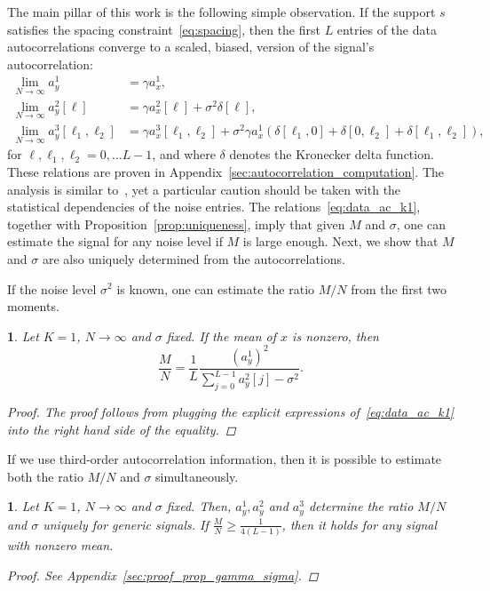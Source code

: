 \documentclass[english,11pt]{article}
\numberwithin{equation}{section}
\theoremstyle{plain}
\theoremstyle{definition}
\theoremstyle{remark}
\theoremstyle{plain}
\theoremstyle{remark}
\theoremstyle{plain}
\theoremstyle{plain}
\newtheorem{proposition}[thm]{\protect\propositionname}
\providecommand{\propositionname}{Proposition}
\begin{document}
The main pillar of this work is the following simple observation.
If the support $s$ satisfies the spacing constraint~\eqref{eq:spacing}, then the first $L$ entries of the data autocorrelations converge 
to a scaled, biased, version of the signal's autocorrelation:
\begin{align}
\lim_{N\to\infty} a_y^1 &= \gamma a_{x}^1, \nonumber\\
\lim_{N\to\infty} a_y^2[\ell] &= \gamma a_{x}^2[\ell] +\sigma^2\delta[\ell], \label{eq:data_ac_k1} \\
\lim_{N\to\infty} a_y^3[\ell_1,\ell_2] &= \gamma a_{x}^3[\ell_1,\ell_2] + \sigma^2\gamma a_{x}^1(\delta[\ell_1,0]+\delta[0,\ell_2]+\delta[\ell_1,\ell_2]), \nonumber
\end{align}
for $\ell,\ell_1,\ell_2=0,\ldots L-1$, and where $\delta$ denotes the Kronecker delta function. 
These relations are proven in Appendix~\ref{sec:autocorrelation_computation}. The analysis is similar to~\cite{bendory2017bispectrum,boumal2017heterogeneous}, yet a particular caution should be taken with the statistical dependencies of the noise entries. 
The relations~\eqref{eq:data_ac_k1}, together with Proposition~\ref{prop:uniqueness}, imply that given $M$ and $\sigma$, one can estimate the signal for any noise level if $M$ is large enough. Next, we show that  $M$ and $\sigma$ are also uniquely determined from the autocorrelations. 

If the noise level $\sigma^2$ is known, one can estimate the ratio $M/N$ from the first two moments.
\begin{proposition} \label{prop:gamma}
	Let $K=1$, $N\to\infty$ and $\sigma$ fixed. If the mean of $x$ is nonzero, then 
	\begin{equation*}
	\frac{M}{N} = \frac{1}{L}\frac{(a^1_y)^2}{\sum_{j=0}^{L-1}a_y^2[j]-\sigma^2}.
	\end{equation*}
	\begin{proof}
The proof follows from plugging the explicit expressions of~\eqref{eq:data_ac_k1} into the right hand side of the equality.
\end{proof}
\end{proposition}

If we use third-order autocorrelation information, then it is possible to estimate both the ratio $M/N$ and $\sigma$ simultaneously.
\begin{proposition} \label{prop:gamma_sigma}
	Let $K=1$, $N\to\infty$ and $\sigma$ fixed. Then, $a_y^1,a_y^2$ and  $a_y^3$ determine the ratio $M/N$ and $\sigma$ uniquely for generic signals. If $\frac{M}{N}\geq\frac{1}{4(L-1)}$, then it holds for any signal with nonzero mean. 
	\begin{proof}
		See Appendix~\ref{sec:proof_prop_gamma_sigma}.
	\end{proof}
\end{proposition}
\end{document}
